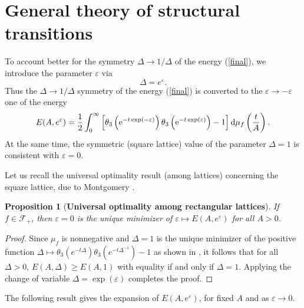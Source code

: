 \documentclass[12pt]{interact}
\newtheorem{prop}[thm]{Proposition}
\theoremstyle{definition}
\begin{document}
\section{General theory of structural transitions} \label{Sec3}
To account better for the symmetry $\Delta\to 1/\Delta$ of the energy 
(\ref{final}), we introduce the parameter $\varepsilon$ via
\begin{equation} \label{Delta}
\Delta = e^\varepsilon .
\end{equation}
Thus the $\Delta\to 1/\Delta$ symmetry of the energy (\ref{final}) is
converted to the $\varepsilon\to -\varepsilon$ one of the energy
\begin{equation} \label{finall}
E(A,e^\varepsilon) = \frac{1}{2} \int_0^\infty 
\left[ \theta_3\left({\rm e}^{-t\exp(-\varepsilon)}\right)
\theta_3\left({\rm e}^{-t\exp(\varepsilon)}\right) - 1 \right]{\rm d}\mu_f\left(\frac{t}{A} \right) . 
\end{equation}
At the same time, the symmetric (square lattice) value of the parameter
$\Delta=1$ is consistent with $\varepsilon=0$. 

\medskip

Let us recall the universal optimality result (among lattices) concerning the square lattice, due to Montgomery \cite{Montgomery88}.

\begin{prop}[\textbf{Universal optimality among rectangular lattices}]
If $f\in \mathcal{F}_+$, then $\varepsilon=0$ is the unique minimizer of $\varepsilon\mapsto E(A,e^\varepsilon)$ for all $A>0$.
\end{prop}
\begin{proof}
Since $\mu_f$ is nonnegative and $\Delta=1$ is the unique minimizer of the positive function $\Delta\mapsto \theta_3(e^{-t\Delta})\theta_3(e^{-t\Delta^{-1}})-1$ as shown in \cite{Montgomery88}, it follows that for all $\Delta>0$, $E(A,\Delta)\geq E(A,1)$ with equality if and only if $\Delta=1$. Applying the change of variable $\Delta=\exp(\varepsilon)$ completes the proof.
\end{proof}


The following result gives the expansion of $E(A,e^\varepsilon)$, for fixed $A$ and as $\varepsilon\to 0$.
\end{document}
